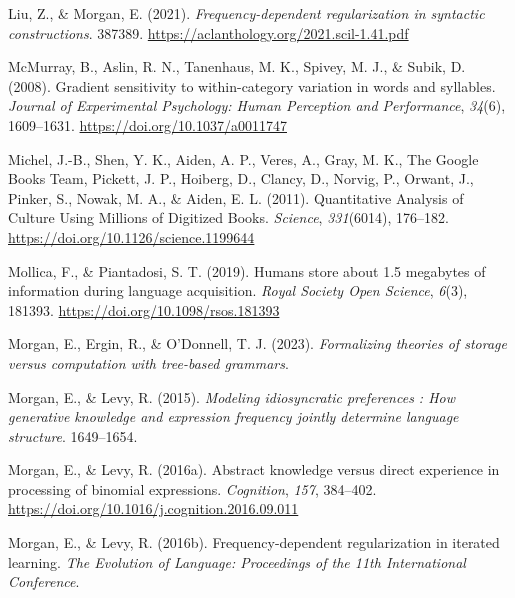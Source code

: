 \documentclass[
  12pt,
]{scrartcl}
\newlength{\cslhangindent}
\newenvironment{CSLReferences}[2] %
 {\begin{list}{}{%
  \setlength{\itemindent}{0pt}
  \setlength{\leftmargin}{0pt}
  \setlength{\parsep}{0pt}
  \ifodd #1
   \setlength{\leftmargin}{\cslhangindent}
   \setlength{\itemindent}{-1\cslhangindent}
  \fi
  \setlength{\itemsep}{#2\baselineskip}}}
 {\end{list}}
\begin{document}
\begin{CSLReferences}{1}{0}
Liu, Z., \& Morgan, E. (2021). \emph{Frequency-dependent regularization
in syntactic constructions}. 387389.
\url{https://aclanthology.org/2021.scil-1.41.pdf}

McMurray, B., Aslin, R. N., Tanenhaus, M. K., Spivey, M. J., \& Subik,
D. (2008). Gradient sensitivity to within-category variation in words
and syllables. \emph{Journal of Experimental Psychology: Human
Perception and Performance}, \emph{34}(6), 1609--1631.
\url{https://doi.org/10.1037/a0011747}

Michel, J.-B., Shen, Y. K., Aiden, A. P., Veres, A., Gray, M. K., The
Google Books Team, Pickett, J. P., Hoiberg, D., Clancy, D., Norvig, P.,
Orwant, J., Pinker, S., Nowak, M. A., \& Aiden, E. L. (2011).
Quantitative Analysis of Culture Using Millions of Digitized Books.
\emph{Science}, \emph{331}(6014), 176--182.
\url{https://doi.org/10.1126/science.1199644}

Mollica, F., \& Piantadosi, S. T. (2019). Humans store about 1.5
megabytes of information during language acquisition. \emph{Royal
Society Open Science}, \emph{6}(3), 181393.
\url{https://doi.org/10.1098/rsos.181393}

Morgan, E., Ergin, R., \& O'Donnell, T. J. (2023). \emph{Formalizing
theories of storage versus computation with tree-based grammars}.

Morgan, E., \& Levy, R. (2015). \emph{Modeling idiosyncratic preferences
: How generative knowledge and expression frequency jointly determine
language structure}. 1649--1654.

Morgan, E., \& Levy, R. (2016a). Abstract knowledge versus direct
experience in processing of binomial expressions. \emph{Cognition},
\emph{157}, 384--402.
\url{https://doi.org/10.1016/j.cognition.2016.09.011}

Morgan, E., \& Levy, R. (2016b). Frequency-dependent regularization in
iterated learning. \emph{The Evolution of Language: Proceedings of the
11th International Conference}.


\end{CSLReferences}
\end{document}
